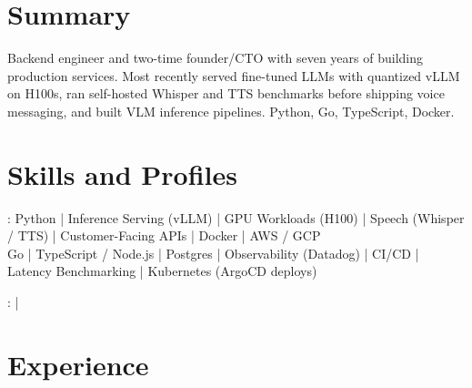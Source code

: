 \documentclass[print]{jack-resume}
\begin{document}
\pagecolor{darkmodeBackground}


\begin{minipage}[t][1cm][t]{.03\textwidth}
    \hfill
\end{minipage}

\section{Summary}
Backend engineer and two-time founder/CTO with seven years of building production services. Most recently served fine-tuned LLMs with quantized vLLM on H100s, ran self-hosted Whisper and TTS benchmarks before shipping voice messaging, and built VLM inference pipelines. Python, Go, TypeScript, Docker.
\sectionsep

\section{Skills and Profiles}
:
Python \hfill | \hfill
Inference Serving (vLLM) \hfill | \hfill
GPU Workloads (H100) \hfill | \hfill
Speech (Whisper / TTS) \hfill | \hfill
Customer-Facing APIs \hfill | \hfill
Docker \hfill | \hfill
AWS / GCP \\
\hspace{1.0cm} Go \hfill | \hfill
TypeScript / Node.js \hfill | \hfill
Postgres \hfill | \hfill
Observability (Datadog) \hfill | \hfill
CI/CD \hfill | \hfill
Latency Benchmarking \hfill | \hfill
Kubernetes (ArgoCD deploys) \\

\raggedright{
    :
      \href{https://www.linkedin.com/in/jack-sturtevant/}{ \ExternalLink} |
     \href{https://github.com/jacksturt}{ \ExternalLink}}

\section{Experience}
\end{document}

